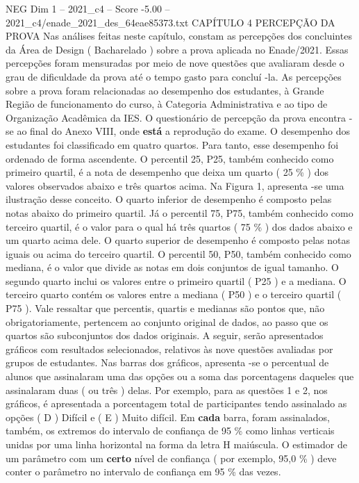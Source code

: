 \begin{textsample}{NEG Dim 1 – 2021\_c4 – Score -5.00 – 2021\_c4/enade\_2021\_des\_64eae85373.txt}  \label{ex:f1_neg_063}
CAPÍTULO 4 PERCEPÇÃO DA PROVA Nas análises feitas neste capítulo, constam as percepções dos concluintes da Área de Design ( Bacharelado ) sobre a prova aplicada no Enade/2021.
Essas percepções foram mensuradas por meio de nove questões que avaliaram desde o grau de dificuldade da prova até o tempo gasto para concluí -la.
As percepções sobre a prova foram relacionadas ao desempenho dos estudantes, à Grande Região de funcionamento do curso, à Categoria Administrativa e ao tipo de Organização Acadêmica da IES.
O questionário de percepção da prova encontra -se ao final do Anexo VIII, onde \textbf{está} a reprodução do exame.
O desempenho dos estudantes foi classificado em quatro quartos.
Para tanto, esse desempenho foi ordenado de forma ascendente.
O percentil 25, P25, também conhecido como primeiro quartil, é a nota de desempenho que deixa um quarto ( 25 \% ) dos valores observados abaixo e três quartos acima.
Na Figura 1, apresenta -se uma ilustração desse conceito.
O quarto inferior de desempenho é composto pelas notas abaixo do primeiro quartil.
Já o percentil 75, P75, também conhecido como terceiro quartil, é o valor para o qual há três quartos ( 75 \% ) dos dados abaixo e um quarto acima dele.
O quarto superior de desempenho é composto pelas notas iguais ou acima do terceiro quartil.
O percentil 50, P50, também conhecido como mediana, é o valor que divide as notas em dois conjuntos de igual tamanho.
O segundo quarto inclui os valores entre o primeiro quartil ( P25 ) e a mediana.
O terceiro quarto contém os valores entre a mediana ( P50 ) e o terceiro quartil ( P75 ).
Vale ressaltar que percentis, quartis e medianas são pontos que, não obrigatoriamente, pertencem ao conjunto original de dados, ao passo que os quartos são subconjuntos dos dados originais.
A seguir, serão apresentados gráficos com resultados selecionados, relativos às nove questões avaliadas por grupos de estudantes.
Nas barras dos gráficos, apresenta -se o percentual de alunos que assinalaram uma das opções ou a soma das porcentagens daqueles que assinalaram duas ( ou três ) delas.
Por exemplo, para as questões 1 e 2, nos gráficos, é apresentada a porcentagem total de participantes tendo assinalado as opções ( D ) Difícil e ( E ) Muito difícil.
Em \textbf{cada} barra, foram assinalados, também, os extremos do intervalo de confiança de 95 \% como linhas verticais unidas por uma linha horizontal na forma da letra H maiúscula.
O estimador de um parâmetro com um \textbf{certo} nível de confiança ( por exemplo, 95,0 \% ) deve conter o parâmetro no intervalo de confiança em 95 \% das vezes.

\end{textsample}

